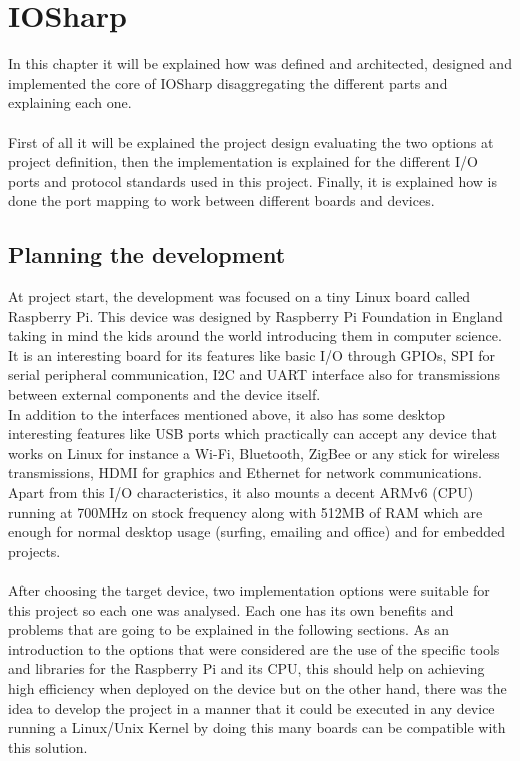 \chapter{IOSharp}\label{C:IOSharp development}
In this chapter it will be explained how was defined and architected, designed and implemented the core of IOSharp disaggregating the different parts and explaining each one.
\\
\\
First of all it will be explained the project design evaluating the two options at project definition, then the implementation is explained for the different I/O ports and protocol standards used in this project. Finally, it is explained how is done the port mapping to work between different boards and devices.

\section{Planning the development}\label{S:IOSharp-Design}
At project start, the development was focused on a tiny Linux board called Raspberry Pi. This device was designed by Raspberry Pi Foundation in England taking in mind the kids around the world introducing them in computer science. It is an interesting board for its features like basic I/O through GPIOs, \gls{SPI} for serial peripheral communication, \gls{I2C} and UART interface also for transmissions between external components and the device itself.
\\
In addition to the interfaces mentioned above, it also has some desktop interesting features like USB ports which practically can accept any device that works on Linux for instance a Wi-Fi, Bluetooth, ZigBee or any stick for wireless transmissions, HDMI for graphics and Ethernet for network communications. Apart from this I/O characteristics, it also mounts a decent ARMv6 (CPU) running at 700MHz on stock frequency along with 512MB of RAM which are enough for normal desktop usage (surfing, emailing and office) and for embedded projects.
\\
\\
After choosing the target device, two implementation options were suitable for this project so each one was analysed. Each one has its own benefits and problems that are going to be explained in the following sections. As an introduction to the options that were considered are the use of the specific tools and libraries for the Raspberry Pi and its CPU, this should help on achieving high efficiency when deployed on the device but on the other hand, there was the idea to develop the project in a manner that it could be executed in any device running a Linux/Unix Kernel by doing this many boards can be compatible with this solution.

